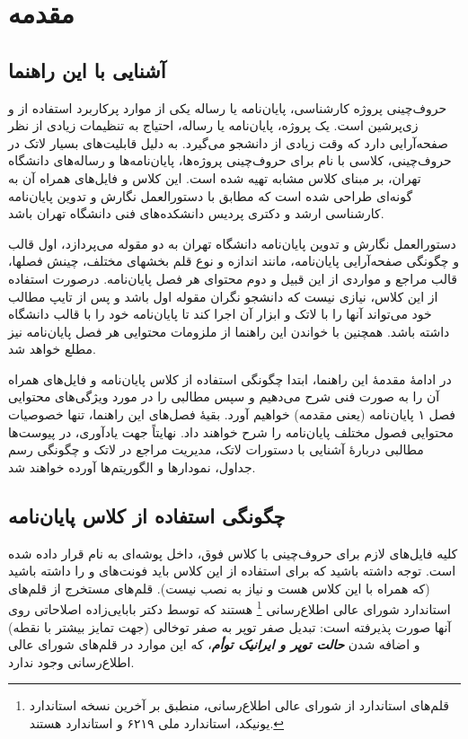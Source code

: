 
\chapter{مقدمه}
\section{آشنایی با این راهنما}
حروف‌چینی پروژه کارشناسی، پایان‌نامه یا رساله یکی از موارد پرکاربرد استفاده از
\lr{\LaTeX}
و زی‌پرشین
\cite{Khalighi87xepersian}
است. یک پروژه، پایان‌نامه یا رساله، احتیاج به تنظیمات زیادی از نظر صفحه‌آرایی دارد که وقت زیادی از دانشجو می‌گیرد. به دلیل قابلیت‌های بسیار لاتک در حروف‌چینی، کلاسی با نام
برای حروف‌چینی پروژه‌ها، پایان‌نامه‌ها و رساله‌های دانشگاه تهران، بر مبنای کلاس مشابه
تهیه شده است. این کلاس و فایل‌های همراه آن به گونه‌ای طراحی شده است که مطابق با دستورالعمل نگارش و تدوین پایان‌نامه کارشناسی ارشد و دکتری پردیس دانشکده‌های فنی دانشگاه تهران
\cite{UTThesisGuide}
باشد.

دستورالعمل نگارش و تدوین پایان‌نامه دانشگاه تهران به دو مقوله می‌پردازد، اول قالب و چگونگی صفحه‌آرایی پایان‌نامه، مانند اندازه و نوع قلم بخشهای مختلف، چینش فصلها، قالب مراجع و مواردی از این قبیل و دوم محتوای هر فصل پایان‌نامه.
درصورت استفاده از این کلاس، نیازی نیست که دانشجو نگران مقوله اول باشد و پس از تایپ مطالب خود می‌تواند آنها را با لاتک و ابزار آن اجرا کند تا پایان‌نامه خود را با قالب دانشگاه داشته باشد. همچنین با خواندن این راهنما از ملزومات محتوایی هر فصل پایان‌نامه نیز مطلع خواهد شد.

در ادامهٔ  مقدمهٔ این راهنما، ابتدا چگونگی استفاده از کلاس پایان‌نامه و فایل‌های همراه آن را به صورت فنی شرح می‌دهیم و سپس مطالبی را در مورد ویژگی‌های محتوایی فصل ۱ پایان‌نامه (یعنی مقدمه) خواهیم آورد.
بقیهٔ فصل‌های این راهنما، تنها خصوصیات محتوایی فصول مختلف پایان‌نامه را شرح خواهند داد. نهایتاً جهت یادآوری، در پیوست‌ها مطالبی دربارهٔ آشنایی با دستورات لاتک، مدیریت مراجع در لاتک و چگونگی رسم جداول، نمودارها و الگوریتم‌ها آورده خواهند شد.

\section{چگونگی استفاده از کلاس پایان‌نامه}
کلیه فایل‌های لازم برای حروف‌چینی با کلاس فوق، داخل پوشه‌ای به نام
قرار داده شده است. توجه داشته باشید که برای استفاده از این کلاس باید فونت‌های
و
را داشته باشید (که همراه با این کلاس هست و نیاز به نصب نیست).
قلم‌های
مستخرج از قلم‌های استاندارد
شورای عالی اطلاع‌رسانی%
\footnote{
	قلم‌های استاندارد
	از شورای عالی اطلاع‌رسانی، منطبق بر آخرین نسخه استاندارد یونیکد، استاندارد ملی ۶۲۱۹ و استاندارد
	هستند.
}
هستند که توسط دکتر بابایی‌زاده اصلاحاتی روی آنها صورت پذیرفته است: تبدیل صفر توپر به صفر توخالی (جهت تمایز بیشتر با نقطه) و اضافه شدن
\textit{\textbf{حالت توپر و ایرانیک توأم}}،
که این موارد در قلم‌های شورای عالی اطلاع‌رسانی وجود ندارد.

